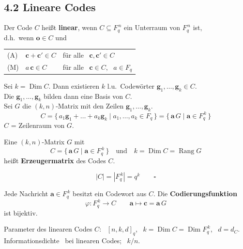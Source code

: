 \subsection{4.2 Lineare Codes}

\begin{definition}
Der Code $C$ heißt \textbf{linear}, wenn $C \subseteq F_q^{\,n}$ ein Unterraum von $F_q^{\,n}$ ist,\\
d.h.\ wenn $\mathbf{o} \in C$ und\\
\begin{tabular}{lll}
(A) & $\mathbf{c} + \mathbf{c}' \in C$ & für alle \ $\mathbf{c}, \mathbf{c}' \in C$ \\
(M) & $a\,\mathbf{c} \in C$ & für alle \ $\mathbf{c} \in C$, \ $a \in F_q$ \\
\end{tabular}
\end{definition}

Sei $k = \operatorname{Dim} C$. Dann existieren $k$ l.u.\ Codewörter $\mathbf{g}_1, \dots, \mathbf{g}_k \in C$.\\
Die $\mathbf{g}_1, \dots, \mathbf{g}_k$ bilden dann eine Basis von $C$.\\
Sei $G$ die $(k, n)$-Matrix mit den Zeilen $\mathbf{g}_1, \dots, \mathbf{g}_k$.
\[ C = \{\, a_1\mathbf{g}_1 + \dots + a_k\mathbf{g}_k \mid a_1, \dots, a_k \in F_q \,\} = \{\, \mathbf{a}\,G \mid \mathbf{a} \in F_q^{\,k} \,\} \]
$C$ = Zeilenraum von $G$.

\begin{definition}[Erzeugermatrix]
Eine $(k, n)$-Matrix $G$ mit
\[ C = \{\, \mathbf{a}\,G \mid \mathbf{a} \in F_q^{\,k} \,\} \quad \text{und} \quad k = \operatorname{Dim} C = \operatorname{Rang} G \]
heißt \textbf{Erzeugermatrix} des Codes $C$.
\end{definition}

\begin{korollar}[Folgerung]
\[ |C| = |F_q^{\,k}| = q^k \qquad \square \]
\end{korollar}

Jede Nachricht $\mathbf{a} \in F_q^{\,k}$ besitzt ein Codewort aus $C$. Die \textbf{Codierungsfunktion}
\[ \varphi : F_q^{\,k} \to C \qquad \mathbf{a} \mapsto \mathbf{c} = \mathbf{a}\,G \]
ist bijektiv.

Parameter des linearen Codes $C$: \ $[n, k, d]_q$, \ $k = \operatorname{Dim} C = \operatorname{Dim} F_q^{\,k}$, \ $d = d_C$.\\
Informationsdichte \ bei linearen Codes; \ $k / n$.

